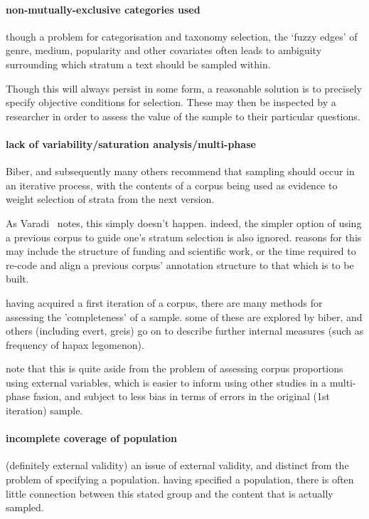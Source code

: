 \paragraph{ non-mutually-exclusive categories used}
though a problem for categorisation and taxonomy selection, the `fuzzy edges' of genre, medium, popularity and other covariates often leads to ambiguity surrounding which stratum a text should be sampled within.

Though this will always persist in some form, a reasonable solution is to precisely specify objective conditions for selection. These may then be inspected by a researcher in order to assess the value of the sample to their particular questions.


\paragraph{ lack of variability/saturation analysis/multi-phase}
Biber, and subsequently many others  recommend that sampling should occur in an iterative process, with the contents of a corpus being used as evidence to weight selection of strata from the next version.

As Varadi~\cite{varadi2000corpus}\cite{varadi2001linguistic} notes, this simply doesn't happen.  indeed, the simpler option of using a previous corpus to guide one's stratum selection is also ignored.  reasons for this may include the structure of funding and scientific work, or the time required to re-code and align a previous corpus' annotation structure to that which is to be built.  

having acquired a first iteration of a corpus, there are many methods for assessing the 'completeness' of a sample.  some of these are explored by biber, and others (including evert, greis) go on to describe further internal measures (such as frequency of hapax legomenon).

note that this is quite aside from the problem of assessing corpus proportions using external variables, which is easier to inform using other studies in a multi-phase fasion, and subject to less bias in terms of errors in the original (1st iteration) sample.


\paragraph{ incomplete coverage of population }
(definitely external validity)
an issue of external validity, and distinct from the problem of specifying a population.  having specified a population, there is often little connection between this stated group and the content that is actually sampled.

